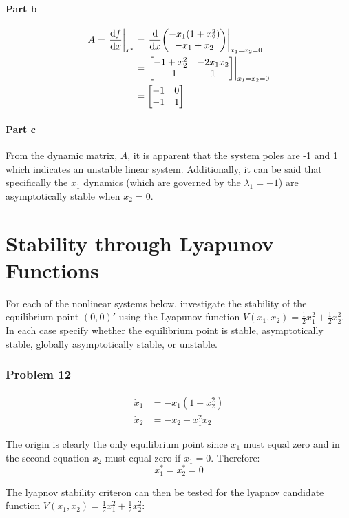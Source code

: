 \documentclass[]{article}
\begin{document}
\subsection{Part b}
\begin{align*}
	A = \eval{\dv{f}{x}}_{x^*} &= \eval{\dv{x} \mqty(-x_1 (1 + x_2^2)\\ -x_1 + x_2)}_{x_1=x_2=0}\\
	&= \eval{\mqty[-1 + x_2^2 & -2 x_1 x_2\\ -1 & 1]}_{x_1=x_2=0}\\
	&= \mqty[-1 & 0\\ -1 &1]
\end{align*}

\subsection{Part c}
From the dynamic matrix, $A$, it is apparent that the system poles are -1 and 1 which indicates an unstable linear system. Additionally, it can be said that specifically the $x_1$ dynamics (which are governed by the $\lambda_1 = -1$) are asymptotically stable when $x_2 = 0$.

\newpage
\part{Stability through Lyapunov Functions}
For each of the nonlinear systems below, investigate the stability of the equilibrium point $(0,0)'$ using the Lyapunov function $V(x_1, x_2) = \frac{1}{2} x_1^2 + \frac{1}{2} x_2^2$. In each case specify whether the equilibrium point is stable, asymptotically stable, globally asymptotically stable, or unstable.

\section{Problem 12}
\begin{align*}
	\dot{x}_1 &= -x_1 (1 + x_2^2)\\
	\dot{x}_2 &= -x_2 - x_1^2 x_2
\end{align*}

The origin is clearly the only equilibrium point since $x_1$ must equal zero and in the second equation $x_2$ must equal zero if $x_1 = 0$. Therefore:
\begin{displaymath}
	x_1^* = x_2^* = 0
\end{displaymath}

The lyapnov stability criteron can then be tested for the lyapnov candidate function  $V(x_1, x_2) = \frac{1}{2} x_1^2 + \frac{1}{2} x_2^2$:
\end{document}
